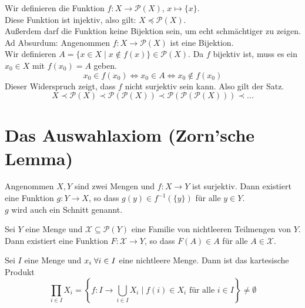 \documentclass[main.tex]{subfiles}
\begin{document}
\begin{Beweis}
  Wir definieren die Funktion $f:X \to \mathcal{P}(X)$, $x\mapsto \{ x\}$.\\
  Diese Funktion ist injektiv, also gilt: $X \preccurlyeq \mathcal{P}(X)$.\\
  Außerdem darf die Funktion keine Bijektion sein, um echt schmächtiger zu zeigen. Ad Absurdum: Angenommen $f:X \to \mathcal{P}(X)$ ist eine Bijektion.\\
  Wir definieren $A=\{ x \in X \mid x \notin f(x)\} \in \mathcal{P}(X)$. Da $f$ bijektiv ist, muss es ein $x_0 \in X$ mit $f(x_0)=A$ geben.\\
  $$x_0 \in f(x_0) \Leftrightarrow x_0 \in A \Leftrightarrow x_0 \notin f(x_0)$$
  Dieser Widerspruch zeigt, dass $f$ nicht surjektiv sein kann. Also gilt der Satz.\\
  $$X \prec \mathcal{P}(X) \prec \mathcal{P}(\mathcal{P}(X)) \prec \mathcal{P}(\mathcal{P}(\mathcal{P}(X))) \prec ...$$
\end{Beweis}



\section{Das Auswahlaxiom (Zorn'sche Lemma)}

\begin{Theorem}[Auswahlaxiom]
  Angenommen $X,Y$ sind zwei Mengen und $f:X\to Y$ ist surjektiv. Dann existiert eine Funktion $g:Y\to X$, so dass $g(y) \in f^{-1}(\{ y\})$ für alle $y \in Y$.\\
  $g$ wird auch ein Schnitt genannt.
\end{Theorem}

\begin{Korollar}[Auswahlaxiom]
  Sei $Y$ eine Menge und $\mathcal{X} \subseteq \mathcal{P}(Y)$ eine Familie von nichtleeren Teilmengen von $Y$. Dann existiert eine Funktion $F: \mathcal{X} \to Y$, so dass $F(A)\in A$ für alle $A \in \mathcal{X}$.
\end{Korollar}

\begin{Korollar}[Auswahlaxiom]
    Sei $I$ eine Menge und $x_i \;\forall i \in I$ eine nichtleere Menge. Dann ist das kartesische Produkt
    $$\prod_{i\in I} X_i = \left\{ f: I \to \bigcup_{i\in I} X_i \mid f(i)\in X_i \text{ für alle } i \in I \right\} \neq \emptyset$$
\end{Korollar}
\end{document}
